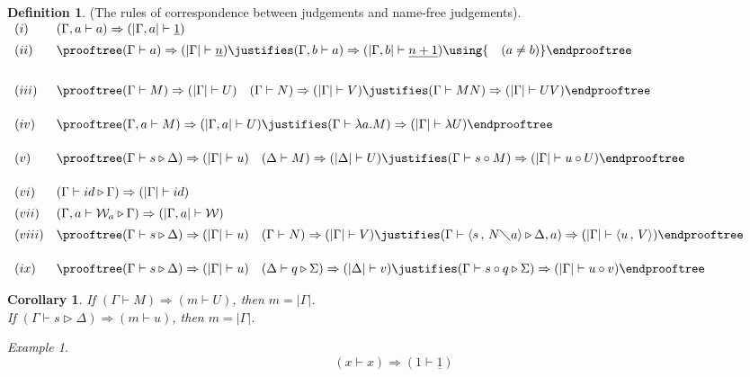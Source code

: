 \documentclass[11pt]{amsart}
\def\ruleone#1#2{\prooftree #1 \justifies #2 \endprooftree}
\def\ruletwo#1#2#3{\ruleone{#1\quad #2}{#3}}
\theoremstyle{plain}
\newtheorem{corollary}[theorem]{Corollary}
\theoremstyle{definition}
\newtheorem{definition}[theorem]{Definition}
\theoremstyle{remark}
\newtheorem{example}[theorem]{Example}
\numberwithin{equation}{section}
\newcommand{\tri}{\triangleright}
\newcommand{\ci}{\circ}
\newcommand{\mi}{\,,\,}
\newcommand{\is}{\diagdown}
\newcommand{\x}{a}
\newcommand{\y}{b}
\renewcommand{\pi}{\mathcal{W}}
\begin{document}
\begin{definition}\label{deftransfer}(The rules of correspondence between judgements and name-free judgements).\\
$
\begin{array}{ll}
(i)& (\Gamma,\x\vdash \x)\Rightarrow  (|\Gamma,\x|\vdash \underline{1}) \\[5pt]
 (ii)& \ruleone{(\Gamma\vdash
\x)\Rightarrow  (|\Gamma| \vdash \underline{n})}{(\Gamma,\y\vdash \x)\Rightarrow  (|\Gamma,\y| \vdash \underline{n+1})\using {\quad(\x\neq \y)}}\\[20pt]
 (iii)& \ruletwo{(\Gamma\vdash M)\Rightarrow  (|\Gamma| \vdash U)}{(\Gamma\vdash N)\Rightarrow  (|\Gamma| \vdash V)}{(\Gamma\vdash
MN)\Rightarrow  (|\Gamma|  \vdash UV)}\\[15pt]
 (iv)& \ruleone{(\Gamma,\x\vdash M)\Rightarrow  (|\Gamma,\x| \vdash U)}{(\Gamma\vdash\lambda \x.M)\Rightarrow  (|\Gamma| \vdash \lambda U) }\\[15pt]
 (v)& \ruletwo{(\Gamma\vdash s \tri\Delta)\Rightarrow  (|\Gamma| \vdash u) }{(\Delta\vdash M)\Rightarrow  (|\Delta| \vdash U)}{(\Gamma\vdash
 s \ci M)\Rightarrow  (|\Gamma| \vdash u \ci U)}\\[15pt]
(vi)& (\Gamma\vdash id \tri\Gamma)\Rightarrow (|\Gamma| \vdash id ) \\[5pt]
(vii)& (\Gamma,\x\vdash\pi_{\x} \tri\Gamma)\Rightarrow  (|\Gamma,\x| \vdash \pi ) \\[5pt]
(viii)& \ruletwo{(\Gamma\vdash s \tri\Delta)\Rightarrow  (|\Gamma|
\vdash u ) }{(\Gamma\vdash N)\Rightarrow  (|\Gamma| \vdash
V)}{(\Gamma\vdash
\langle s\mi N\is \x\rangle \tri\Delta ,\x)\Rightarrow (|\Gamma| \vdash\langle u\mi V\rangle )}\\[15pt]
(ix)& \ruletwo{(\Gamma\vdash s \tri\Delta)\Rightarrow  (|\Gamma|
\vdash u) }{(\Delta\vdash q \tri\Sigma)\Rightarrow (|\Delta|
\vdash v ) }{(\Gamma \vdash s \ci q \tri\Sigma)\Rightarrow
(|\Gamma|
\vdash u \ci v )}\\
\end{array}
$
\end{definition}
\begin{corollary}If $(\Gamma\vdash M)\Rightarrow(m\vdash U)$, then
$m=|\Gamma|$.\\
 If $(\Gamma\vdash s\tri\Delta)\Rightarrow(m\vdash u)$, then $m=|\Gamma|$.
\end{corollary}
\begin{example}
$$
(x\vdash x)\Rightarrow (1 \vdash \underline{1})
$$
\end{example}
\end{document}

